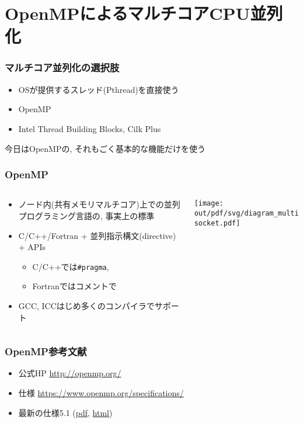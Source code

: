 \documentclass[10pt,dvipdfmx]{beamer}
\newcommand{\ao}[1]{{\color{blue}#1}}
\begin{document}
\section{OpenMPによるマルチコアCPU並列化}

\begin{frame}
\frametitle{マルチコア並列化の選択肢}
\begin{itemize}
\item OSが提供するスレッド(Pthread)を直接使う
\item \ao{OpenMP}
\item Intel Thread Building Blocks, Cilk Plus
\end{itemize}

今日はOpenMPの, それもごく基本的な機能だけを使う
\end{frame}


\begin{frame}
\frametitle{OpenMP}

\begin{columns}
  \begin{column}{0.6\textwidth}
\begin{itemize}
\item ノード内(共有メモリマルチコア)上での並列プログラミング言語の,
  事実上の標準
\item C/C++/Fortran + \ao{並列指示構文(directive) + APIs}
  \begin{itemize}
  \item C/C++では\ao{\tt \#pragma}, 
  \item Fortranではコメントで
  \end{itemize}
\item GCC, ICCはじめ多くのコンパイラでサポート
\end{itemize}
\end{column}
\begin{column}{0.4\textwidth}
  \begin{center}
    \texttt{[image: out/pdf/svg/diagram\_multisocket.pdf]}
  \end{center}
\end{column}
\end{columns}
\end{frame}

\begin{frame}
\frametitle{OpenMP参考文献}
\begin{itemize}
\item 公式HP
  \url{http://openmp.org/}
\item 仕様
  \url{https://www.openmp.org/specifications/}
\item 最新の仕様5.1
(\href{https://www.openmp.org/wp-content/uploads/OpenMP-API-Specification-5-1.pdf}{pdf}, \href{https://www.openmp.org/spec-html/5.1/openmp.html}{html})
\end{itemize}

\end{frame}
\end{document}
